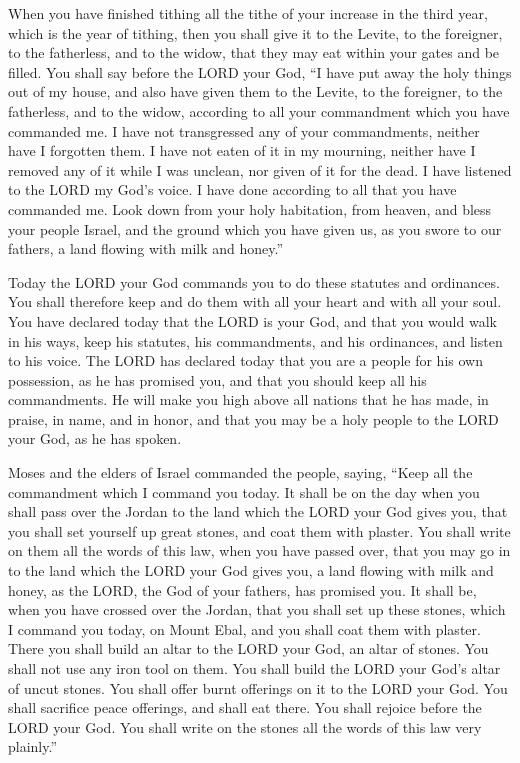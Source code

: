 \myverse{}When you have finished tithing all the tithe of your increase
in the third year, which is the year of tithing, then you shall give it to the Levite, to the foreigner,
to the fatherless, and to the widow, that they may eat within your gates and be filled.
\myverse{}You shall say before the LORD your God, “I have put away the holy things
out of my house, and also have given them to the Levite, to the foreigner, to the fatherless, and to the
widow, according to all your commandment which you have commanded me. I have not transgressed any of your
commandments, neither have I forgotten them.
\myverse{}I have not eaten of it in my mourning, neither have I removed any of it while
I was unclean, nor given of it for the dead. I have listened to the LORD my God’s voice. I have done according
to all that you have commanded me.
\myverse{}Look down from your holy habitation, from heaven, and bless your people Israel,
and the ground which you have given us, as you swore to our fathers, a land flowing with milk and honey.”

\myverse{}Today the LORD your God commands you to do these statutes and
ordinances. You shall therefore keep and do them with all your heart and with all your soul.
\myverse{}You have declared today that the LORD is your God, and that you would walk
in his ways, keep his statutes, his commandments, and his ordinances, and listen to his voice.
\myverse{}The LORD has declared today that you are a people for his own possession,
as he has promised you, and that you should keep all his commandments.
\myverse{}He will make you high above all nations that he has made, in praise, in name,
and in honor, and that you may be a holy people to the LORD your God, as he has spoken.


\mychapter{} \myverse*{}Moses and the elders of Israel commanded the people, saying, “Keep
all the commandment which I command you today.
\myverse{}It shall be on the day when you shall pass over the Jordan to the land which
the LORD your God gives you, that you shall set yourself up great stones, and coat them with plaster.
\myverse{}You shall write on them all the words of this law, when you have passed over,
that you may go in to the land which the LORD your God gives you, a land flowing with milk and honey,
as the LORD, the God of your fathers, has promised you.
\myverse{}It shall be, when you have crossed over the Jordan, that you shall set up these
stones, which I command you today, on Mount Ebal, and you shall coat them with plaster.
\myverse{}There you shall build an altar to the LORD your God, an altar of stones. You
shall not use any iron tool on them.
\myverse{}You shall build the LORD your God’s altar of uncut stones. You shall offer
burnt offerings on it to the LORD your God.
\myverse{}You shall sacrifice peace offerings, and shall eat there. You shall rejoice
before the LORD your God.
\myverse{}You shall write on the stones all the words of this law very plainly.”


